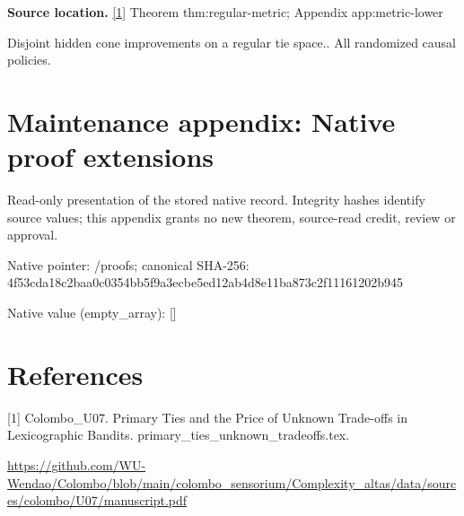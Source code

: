 \documentclass[10pt,a4paper]{article}
\begin{document}
\textbf{Source location.} \href{https://github.com/WU-Wendao/Colombo/blob/main/colombo_sensorium/Complexity_altas/data/sources/colombo/U07/manuscript.pdf}{[1]} Theorem thm:regular-metric; Appendix app:metric-lower



Disjoint hidden cone improvements on a regular tie space.. All randomized causal policies.



\section{Maintenance appendix: Native proof extensions}


Read-only presentation of the stored native record. Integrity hashes identify source values; this appendix grants no new theorem, source-read credit, review or approval.



Native pointer: /proofs; canonical SHA-256: 4f53cda18c2baa0c0354bb5f\allowbreak{}9a3ecbe5ed12ab4d8e11ba87\allowbreak{}3c2f11161202b945



Native value (empty\_array): []



\section{References}


[1] Colombo\_U07. Primary Ties and the Price of Unknown Trade-offs in Lexicographic Bandits. primary\_ties\_unknown\_tradeoffs.tex.



\url{https://github.com/WU-Wendao/Colombo/blob/main/colombo_sensorium/Complexity_altas/data/sources/colombo/U07/manuscript.pdf}
\end{document}
